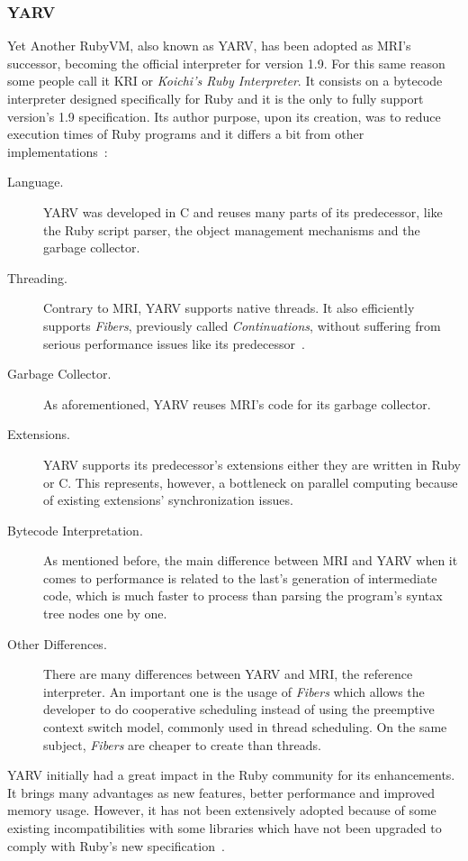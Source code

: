 \subsubsection{YARV}
Yet Another RubyVM, also known as YARV, has been adopted as MRI's successor, becoming the official interpreter for version 1.9. For this same reason some people call it KRI or \textit{Koichi's Ruby Interpreter}. It consists on a bytecode interpreter designed specifically for Ruby and it is the only to fully support version's 1.9 specification. Its author purpose, upon its creation, was to reduce execution times of Ruby programs and it differs a bit from other implementations~\cite{yarv, rubyvm_interview, ruby_intermediate_language}:
\begin{description}
\item[Language.] YARV was developed in C and reuses many parts of its predecessor, like the Ruby script parser, the object management mechanisms and the garbage collector.
\item[Threading.] Contrary to MRI, YARV supports native threads. It also efficiently supports \textit{Fibers}, previously called \textit{Continuations}, without suffering from serious performance issues like its predecessor~\cite{memory_leak_fix_18X}.
\item[Garbage Collector.]  As aforementioned, YARV reuses MRI's code for its garbage collector.
\item[Extensions.]  YARV supports its predecessor's extensions either they are written in Ruby or C. This represents, however, a bottleneck on parallel computing because of existing extensions' synchronization issues.
\item[Bytecode Interpretation.] As mentioned before, the main difference between MRI and YARV when it comes to performance is related to the last's generation of intermediate code, which is much faster to process than parsing the program's syntax tree nodes one by one.
\item[Other Differences.] There are many differences between YARV and MRI, the reference interpreter. An important one is the usage of \textit{Fibers} which allows the developer to do cooperative scheduling instead of using the preemptive context switch model, commonly used in thread scheduling. On the same subject, \textit{Fibers} are cheaper to create than threads. 
\end{description}
YARV initially had a great impact in the Ruby community for its enhancements. It brings many advantages as new features, better performance and improved memory usage. However, it has not been extensively adopted because of some existing incompatibilities with some libraries which have not been upgraded to comply with Ruby's new specification~\cite{rubys_challenge_2009}.



